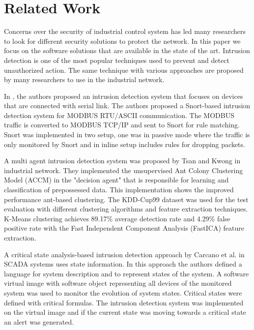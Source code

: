 \documentclass[conference]{IEEEtran}
\begin{document}
\section{Related Work}

Concerns over the security of industrial control system has led many researchers to look for different security solutions to protect the network. In this paper we focus on the software solutions that are available in the state of the art. Intrusion detection is one of the most popular techniques used to prevent and detect unauthorized action. The same technique with various approaches are proposed by many researchers to use in the industrial network. 
\par In \cite{c2}, the authors proposed an intrusion detection system that focuses on devices that are connected with serial link. The authors proposed a Snort-based intrusion detection system for MODBUS RTU/ASCII communication. The MODBUS traffic is converted to MODBUS TCP/IP and sent to Snort for rule matching. Snort was implemented in two setup, one was in passive mode where the traffic is only monitored by Snort and in inline setup includes rules for dropping packets.
\par A multi agent intrusion detection system was proposed by Tsan and Kwong \cite{c3} in industrial network. They implemented the unsupervised Ant Colony Clustering Model (ACCM) in the "decision agent" that is responsible for learning and classification of prepossessed data. This implementation shows the improved performance ant-based clustering. The KDD-Cup99 dataset was used for the test evaluation with different clustering algorithms and feature extraction techniques. K-Means clustering achieves 89.17\% average detection rate and  4.29\% false positive rate with the Fast Independent Component Analysis (FastICA) feature extraction.
\par A critical state analysis-based intrusion detection approach by Carcano et al. \cite{c4} in SCADA systems uses state information. In this approach the authors defined a language for system description and to represent states of the system. A software virtual image with software object representing all devices of the monitored system was used to monitor the evolution of system states. Critical states were defined with critical formulas. The intrusion detection system was implemented on the virtual image and if the current state was moving towards a critical state an alert was generated.
\end{document}

